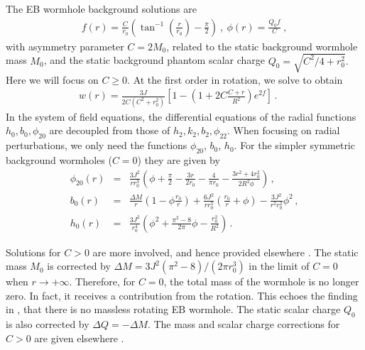 \documentclass{article}
\begin{document}
The EB wormhole background solutions are
\begin{eqnarray}
    f(r) = \frac{{C}}{r_0} \left(\tan^{-1} \! \left(\frac{r}{r_0}\right)-\frac{\pi}{2}\right) \ , \ \phi(r)= \frac{Q_0 f}{C} \ ,
\end{eqnarray}
%
%
with asymmetry parameter $C=2M_0$, related to the static background wormhole mass $M_0$, and the static background phantom scalar charge %
%
%
{$Q_{0} = \sqrt{C^2/4 + r_0^2}$.}
%
%
%
%
%
%
%
%
Here we will focus on $C\ge 0$.
At the first order in rotation, we solve to obtain
%
\begin{eqnarray}
    w(r)= \frac{3J}{2C(C^2+r_0^2)}
    \left[
    1 - \left(
    1+2C\frac{C+r}{R^2}
    \right)e^{2f}
    \right] \, . \, \, \, \, \, \, \, \,
\end{eqnarray}
In the system of field equations, the differential equations of the radial functions $h_0,{b_0},\phi_{20}$ are decoupled from those of ${h_2}, k_2, {b_2}, \phi_{22}$.
%
When focusing on radial perturbations, we only need the functions $\phi_{20}$, {$b_0$}, $h_0$.
For the simpler 
%
{symmetric}
background wormholes ($C=0$)
%
they are given by
\begin{eqnarray}
    \phi_{20}(r) &=& 
    \frac{3J^2}{rr_0^3}
    \left( 
    \phi + \frac{\pi}{2} - \frac{3r}{2r_0} - \frac{4}{\pi r_0} - \frac{3r^2+4r_0^2}{2R^2\phi}
    \right)
    \, , \nonumber \\
%
%
    b_0(r) &=& \frac{\Delta M}{r}
    \left(
    1-\phi\frac{r_0}{r}
    \right)
    +
    \frac{6J^2}{rr_0^3}
    \left(
    \frac{r_0}{r}+\phi
    \right)
    -\frac{3J^2}{r^2r_0^2}\phi^2
        \, , \nonumber \\
%
%
    h_0(r) &=&  \frac{3J^2}{r_0^4}
    \left(
    \phi^2 + \frac{\pi^2-8}{2\pi}\phi - \frac{r_0^2}{R^2}
    \right) \, .
\end{eqnarray}

%
Solutions for $C>0$ are more involved, and hence provided 
%
{elsewhere \cite{Azad:2023}}.
The static mass $M_0$ is corrected by
$\Delta M =3J^2(\pi^2-8)/(2\pi r_0^3)$
%
%
%
in the limit of $C=0$ when $r\rightarrow +\infty$.
Therefore, for %
$C=0$, the total mass of the wormhole is no longer zero. %
In fact, it receives a contribution from the rotation.
This echoes the finding in \cite{Kashargin:2008pk},
that there is no massless rotating {EB} wormhole.
%
The static scalar charge $Q_0$ is also corrected by $\Delta Q=-\Delta M$.
%
The mass {and scalar charge corrections for $C>0$ are} given
%
{elsewhere \cite{Azad:2023}}.
\end{document}
